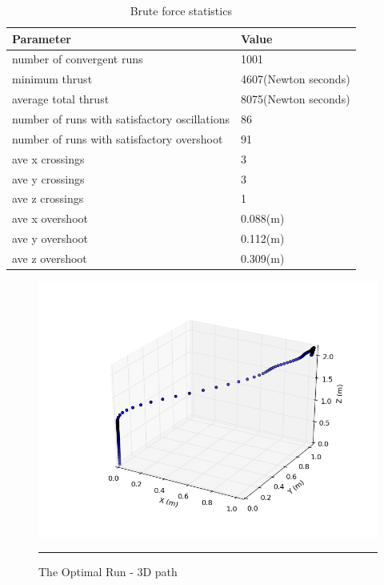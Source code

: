 \begin{table}
\label{table:bruteforcestatistics}
\begin{doublespace}
\centering
\begin{tabular}{l l}
Parameter    & Value\\
\hline
number of convergent runs &  1001\\
minimum thrust &  4607(Newton seconds)\\
average total thrust &  8075(Newton seconds)\\
number of runs with satisfactory oscillations &   86\\
number of runs with satisfactory overshoot & 91\\
ave x crossings &  3\\
ave y crossings &  3\\
ave z crossings &  1\\
ave x overshoot &  0.088(m)\\
ave y overshoot &  0.112(m)\\
ave z overshoot &  0.309(m)\\

\hline
\end{tabular}
\end{doublespace}

\caption[Brute force statistics]{Brute force statistics}
\end{table}









\begin{figure}[htbp]
	\centering
		\includegraphics[width=\textwidth]{Figures/optimal_run_3D_path.png}
		\rule{35em}{0.5pt}
	\caption[Optimal Run 3D Path]{The Optimal Run - 3D path}
	\label{fig:optimal run 3D path}
\end{figure}


